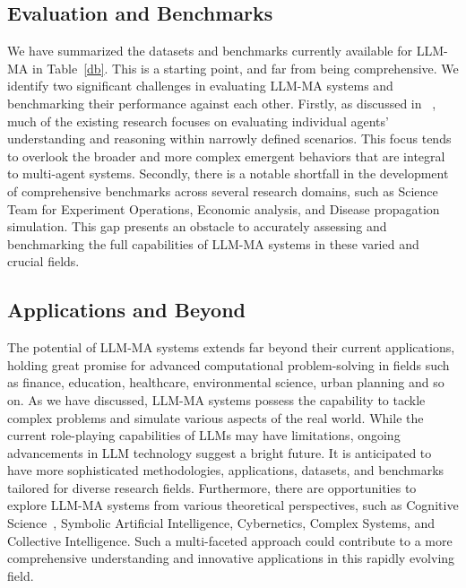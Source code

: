 \subsection{Evaluation and Benchmarks}
We have summarized the datasets and benchmarks currently available for LLM-MA in  Table~\ref{db}. This is a starting point, and far from  being comprehensive. We identify two significant challenges in evaluating  LLM-MA systems and benchmarking their performance against each other. 
Firstly, as discussed in ~\cite{xu2023magic}, much of the existing research focuses on evaluating individual agents' understanding and reasoning within narrowly defined scenarios. This focus tends to overlook the broader and more complex emergent behaviors that are integral to multi-agent systems. 
Secondly, there is a notable shortfall in the development of comprehensive benchmarks across several research domains, such as Science Team for Experiment Operations, Economic analysis, and Disease propagation simulation. This gap presents an obstacle to accurately assessing and benchmarking the full capabilities of LLM-MA systems in these varied and crucial fields.


\subsection{Applications and Beyond}
The potential of LLM-MA systems extends far beyond their current applications, holding great promise for advanced computational problem-solving in fields such as finance, education, healthcare,  environmental science, urban planning and so on. As we have discussed, LLM-MA systems possess the capability to tackle complex problems and simulate various aspects of the real world. While the current role-playing capabilities of LLMs may have limitations, ongoing advancements in LLM technology suggest a bright future. It is anticipated to have more sophisticated methodologies, applications, datasets, and benchmarks tailored for diverse research fields.
Furthermore, there are opportunities to explore LLM-MA systems from various theoretical perspectives, such as Cognitive Science~\cite{sumers2023cognitive}, Symbolic Artificial Intelligence, Cybernetics, Complex Systems, and Collective Intelligence.  Such a multi-faceted approach could  contribute to a more comprehensive understanding and innovative applications in this rapidly evolving field.

